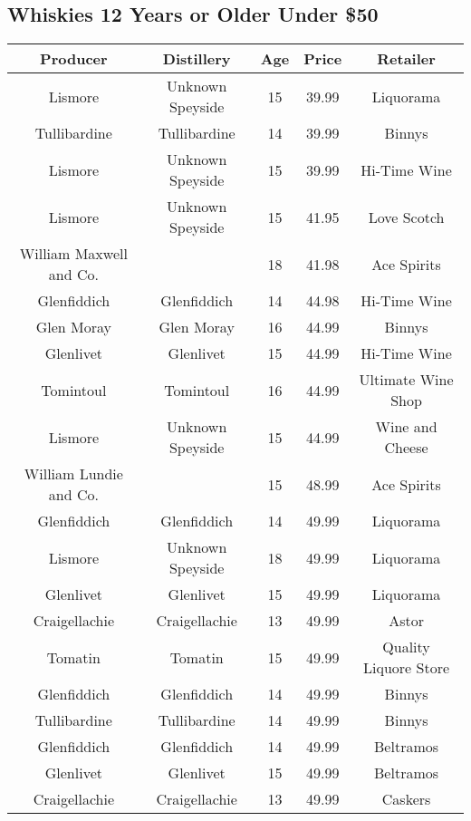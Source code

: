 \begin{appendices}
\chapter{Whiskies 12 Years or Older Under \$50}
\label{sec:Bargains}

\begin{center}
 \begin{tabular}{||c | c | c | c | c ||} 
 \hline
Producer & Distillery & Age & Price & Retailer\\
 \hline
 \hline
Lismore & Unknown Speyside & 15 & 39.99 & Liquorama\\
\hline
Tullibardine & Tullibardine & 14 & 39.99 & Binnys\\
\hline
Lismore & Unknown Speyside & 15 & 39.99 & Hi-Time Wine\\
\hline
Lismore & Unknown Speyside & 15 & 41.95 & Love Scotch\\
\hline
William Maxwell and Co. &  & 18 & 41.98 & Ace Spirits\\
\hline
Glenfiddich & Glenfiddich & 14 & 44.98 & Hi-Time Wine\\
\hline
Glen Moray & Glen Moray & 16 & 44.99 & Binnys\\
\hline
Glenlivet & Glenlivet & 15 & 44.99 & Hi-Time Wine\\
\hline
Tomintoul & Tomintoul & 16 & 44.99 & Ultimate Wine Shop\\
\hline
Lismore & Unknown Speyside & 15 & 44.99 & Wine and Cheese\\
\hline
William Lundie and Co. &  & 15 & 48.99 & Ace Spirits\\
\hline
Glenfiddich & Glenfiddich & 14 & 49.99 & Liquorama\\
\hline
Lismore & Unknown Speyside & 18 & 49.99 & Liquorama\\
\hline
Glenlivet & Glenlivet & 15 & 49.99 & Liquorama\\
\hline
Craigellachie & Craigellachie & 13 & 49.99 & Astor\\
\hline
Tomatin & Tomatin & 15 & 49.99 & Quality Liquore Store\\
\hline
Glenfiddich & Glenfiddich & 14 & 49.99 & Binnys\\
\hline
Tullibardine & Tullibardine & 14 & 49.99 & Binnys\\
\hline
Glenfiddich & Glenfiddich & 14 & 49.99 & Beltramos\\
\hline
Glenlivet & Glenlivet & 15 & 49.99 & Beltramos\\
\hline
Craigellachie & Craigellachie & 13 & 49.99 & Caskers\\

\end{tabular}
\end{center}
\end{appendices}
